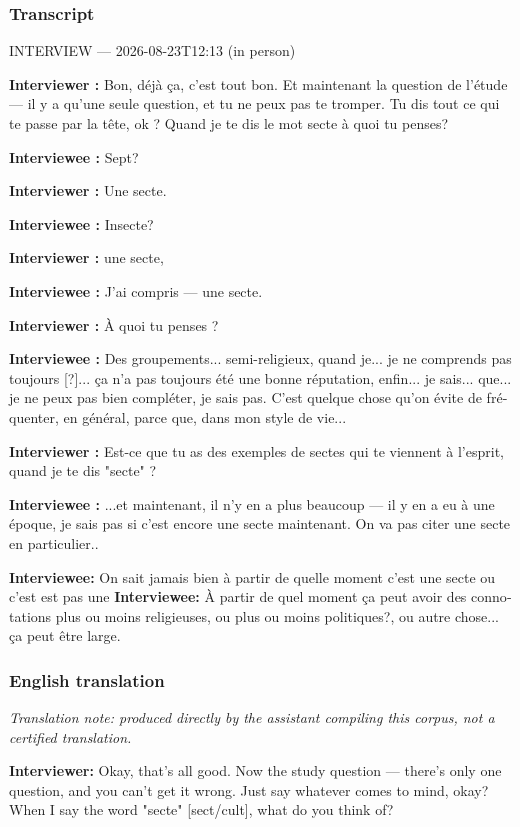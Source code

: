 \subsubsection*{Transcript}
\begin{otherlanguage}{french}
INTERVIEW — 2026-08-23T12:13 (in person)

\textbf{Interviewer :} Bon, déjà ça, c'est tout bon. Et maintenant la question de l'étude — il y a qu'une seule question, et tu ne peux pas te tromper. Tu dis tout ce qui te passe par la tête, ok ? Quand je te dis le mot secte à quoi tu penses?

\textbf{Interviewee :} Sept?

\textbf{Interviewer :} Une secte.

\textbf{Interviewee :} Insecte?

\textbf{Interviewer :} une secte,

\textbf{Interviewee :} J'ai compris — une secte.

\textbf{Interviewer :} À quoi tu penses ?

\textbf{Interviewee :} Des groupements... semi-religieux, quand je... je ne comprends pas toujours [?]... ça n'a pas toujours été une bonne réputation, enfin... je sais... que... je ne peux pas bien compléter, je sais pas. C'est quelque chose qu'on évite de fréquenter, en général, parce que, dans mon style de vie...

\textbf{Interviewer :} Est-ce que tu as des exemples de sectes qui te viennent à l'esprit, quand je te dis "secte" ?

\textbf{Interviewee :} ...et maintenant, il n'y en a plus beaucoup — il y en a eu à une époque, je sais pas si c'est encore une secte maintenant. On va pas citer une secte en particulier..

\textbf{Interviewee:} On sait jamais bien à partir de quelle moment c'est une secte ou c'est est pas une
\textbf{Interviewee:} À partir de quel moment ça peut avoir des connotations plus ou moins religieuses, ou plus ou moins politiques?, ou autre chose... ça peut être large.
\end{otherlanguage}
\subsubsection*{English translation}
\textit{Translation note: produced directly by the assistant compiling this corpus, not a certified translation.}

\textbf{Interviewer:} Okay, that's all good. Now the study question — there's only one question, and you can't get it wrong. Just say whatever comes to mind, okay? When I say the word "secte" [sect/cult], what do you think of?

